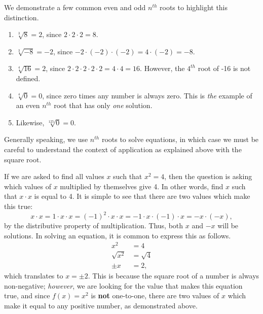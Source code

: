 \documentclass{ximera}
\begin{document}
\begin{example}
We demonstrate a few common even and odd $n^{th}$ roots to highlight this distinction.
\begin{enumerate}
\item $\sqrt[3]{8} = 2$, since $2 \cdot 2 \cdot 2 = 8$.

\item $\sqrt[3]{-8} = - 2$, since $-2 \cdot (-2) \cdot (-2) = 4 \cdot (-2) = -8$.

\item $\sqrt[4]{16} = 2$, since $2 \cdot 2 \cdot 2 \cdot 2 \cdot 2 = 4 \cdot 4 = 16$. However, the $4^{th}$ root of -16 is not defined.

\item $\sqrt[4]{0} =0$, since zero times any number is always zero. This is {\em the} example of an even $n^{th}$ root that has only {\em one} solution.

\item Likewise, $\sqrt[125]{0} = 0$.
\end{enumerate}
\end{example}

Generally speaking, we use $n^{th}$ roots to solve equations, in which case we must be careful to understand the context of application as explained above with the square root.

If we are asked to find all values $x$ such that $x^2=4$, then the question is asking which values of $x$ multiplied by themselves give 4. In other words, find $x$ such that $x \cdot x$ is equal to 4. It is simple to see that there are two values which make this true:
$$x\cdot x = 1\cdot x \cdot x = (-1)^2 \cdot x \cdot x = -1 \cdot x \cdot (-1)\cdot x = -x \cdot (-x),$$
by the distributive property of multiplication. Thus, both $x$ and $-x$ will be solutions. In solving an equation, it is common to express this as follows.
\begin{align*}
x^2 &= 4 \\
\sqrt{x^2} &= \sqrt{4} \\
\pm x &= 2,
\end{align*}
which translates to $x = \pm 2$. This is because the square root of a number is always non-negative; {\em however}, we are looking for the value that makes this equation true, and since $f(x)=x^2$ is \textbf{not} one-to-one, there are two values of $x$ which make it equal to any positive number, as demonstrated above.
\end{document}
